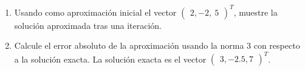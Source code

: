 \documentclass[12pt]{article}
\begin{document}
\begin{enumerate}[leftmargin=*,widest=9]
\begin{enumerate}[label=\alph*]
   \item Usando como aproximación inicial el vector \( \begin{pmatrix} 2, -2, \ 5 \end{pmatrix}^T \), muestre la solución aproximada tras una iteración.
   \item Calcule el error absoluto de la aproximación usando la norma 3 con respecto a la solución exacta. La solución exacta es el vector
   \( \begin{pmatrix} 3, -2.5, 7 \end{pmatrix}^T \).
\end{enumerate}
   \end{enumerate}
\end{document}
